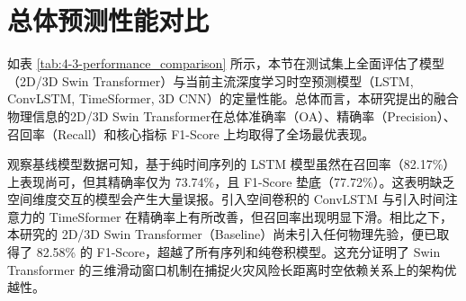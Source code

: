 \section{总体预测性能对比}
\label{sec:4-3}
如表 \ref{tab:4-3-performance_comparison} 所示，本节在测试集上全面评估了模型（2D/3D Swin Transformer）与当前主流深度学习时空预测模型（LSTM, ConvLSTM, TimeSformer, 3D CNN）的定量性能。总体而言，本研究提出的融合物理信息的2D/3D Swin Transformer在总体准确率（OA）、精确率（Precision）、召回率（Recall）和核心指标 F1-Score 上均取得了全场最优表现。
\begin{table}[htbp]
    \centering
    \caption{不同深度学习模型在测试集上的定量结果，分类指标以百分比（\%）表示。}
    \label{tab:4-3-performance_comparison}
    \renewcommand{\arraystretch}{1.3} %
\end{table}

观察基线模型数据可知，基于纯时间序列的 LSTM 模型虽然在召回率（82.17\%）上表现尚可，但其精确率仅为 73.74\%，且 F1-Score 垫底（77.72\%）。这表明缺乏空间维度交互的模型会产生大量误报。引入空间卷积的 ConvLSTM 与引入时间注意力的 TimeSformer 在精确率上有所改善，但召回率出现明显下滑。相比之下，本研究的 2D/3D Swin Transformer（Baseline）尚未引入任何物理先验，便已取得了 82.58\% 的 F1-Score，超越了所有序列和纯卷积模型。这充分证明了 Swin Transformer 的三维滑动窗口机制在捕捉火灾风险长距离时空依赖关系上的架构优越性。

